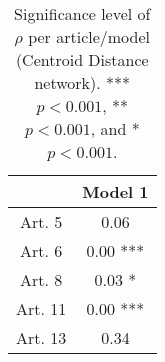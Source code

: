 \begin{table}[ht]
\centering
\begin{tabular}{cc}
  \toprule
 & Model 1 \\ 
  \midrule
Art. 5 & 0.06   \\ 
   \midrule
Art. 6 & 0.00 *** \\ 
   \midrule
Art. 8 & 0.03 * \\ 
   \midrule
Art. 11 & 0.00 *** \\ 
   \midrule
Art. 13 & 0.34   \\ 
   \bottomrule
\end{tabular}
\caption{Significance level of $\rho$ per article/model (Centroid Distance network). *** $p < 0.001$, ** $p < 0.001$, and * $p < 0.001$.} 
\end{table}
